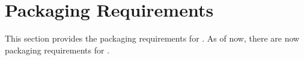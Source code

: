 \KNEADSECTIONNEWPAGE
\section{Packaging Requirements}
\label{lab:sec_Packaging}
% 

This section provides the packaging requirements for \ThisSys. As of now, there are now packaging requirements for \ThisSys.



%
